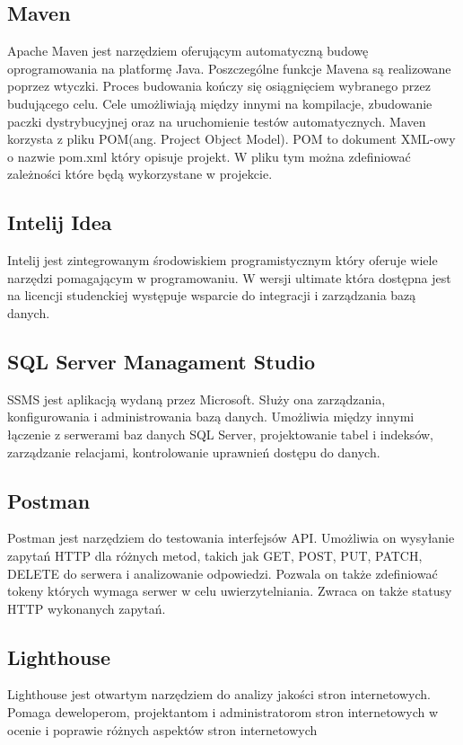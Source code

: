 \subsection{Maven}
Apache Maven jest narzędziem oferującym automatyczną budowę oprogramowania na platformę Java. Poszczególne funkcje Mavena są realizowane poprzez wtyczki. Proces budowania kończy się osiągnięciem wybranego przez budującego celu. Cele umożliwiają między innymi na kompilacje, zbudowanie paczki dystrybucyjnej oraz na uruchomienie testów automatycznych. Maven korzysta z pliku POM(ang. Project Object Model). POM to dokument XML-owy o nazwie pom.xml który opisuje projekt. W pliku tym można zdefiniować zależności które będą wykorzystane w projekcie. 

\subsection{Intelij Idea}
Intelij jest zintegrowanym środowiskiem programistycznym który oferuje wiele narzędzi pomagającym w programowaniu. W wersji ultimate która dostępna jest na licencji studenckiej występuje wsparcie do integracji i zarządzania bazą danych.

\subsection{SQL Server Managament Studio}
\label{ssms:label}
SSMS jest aplikacją wydaną przez Microsoft. Służy ona zarządzania, konfigurowania i administrowania bazą danych. Umożliwia między innymi łączenie z serwerami baz danych SQL Server, projektowanie tabel i indeksów, zarządzanie relacjami, kontrolowanie uprawnień dostępu do danych.

\subsection{Postman}
Postman jest narzędziem do testowania interfejsów API. Umożliwia on wysyłanie zapytań HTTP dla różnych metod, takich jak GET, POST, PUT, PATCH, DELETE do serwera i analizowanie odpowiedzi. Pozwala on także zdefiniować tokeny których wymaga serwer w celu uwierzytelniania. Zwraca on także statusy HTTP wykonanych zapytań.

\subsection{Lighthouse}
Lighthouse jest otwartym narzędziem do analizy jakości stron internetowych. Pomaga deweloperom, projektantom i administratorom stron internetowych w ocenie i poprawie różnych aspektów stron internetowych


